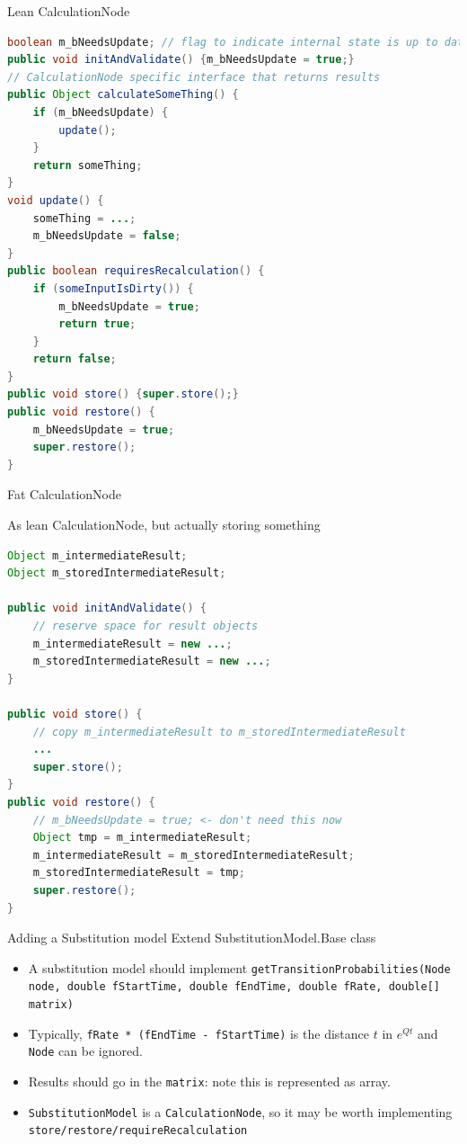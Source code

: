 \documentclass{beamer}
\theoremstyle{definition}
\begin{document}
\begin{frame}[containsverbatim]{Lean CalculationNode}


\begin{lstlisting}[language=java]
boolean m_bNeedsUpdate; // flag to indicate internal state is up to date
public void initAndValidate() {m_bNeedsUpdate = true;}
// CalculationNode specific interface that returns results
public Object calculateSomeThing() {
	if (m_bNeedsUpdate) {
		update();
	}
	return someThing;
}
void update() {
	someThing = ...;
	m_bNeedsUpdate = false;
}
public boolean requiresRecalculation() {
	if (someInputIsDirty()) {
		m_bNeedsUpdate = true;
		return true;
	}
	return false;
}
public void store() {super.store();}
public void restore() {
	m_bNeedsUpdate = true;
	super.restore();
}
\end{lstlisting}
\end{frame}

\begin{frame}[containsverbatim]{Fat CalculationNode}

As lean CalculationNode, but actually storing something

\begin{lstlisting}[language=java]
Object m_intermediateResult;
Object m_storedIntermediateResult;

public void initAndValidate() {
	// reserve space for result objects
	m_intermediateResult = new ...;
 	m_storedIntermediateResult = new ...;
}

public void store() {
	// copy m_intermediateResult to m_storedIntermediateResult
	...
	super.store();
}
public void restore() {
	// m_bNeedsUpdate = true; <- don't need this now
	Object tmp = m_intermediateResult;
	m_intermediateResult = m_storedIntermediateResult;
	m_storedIntermediateResult = tmp;
	super.restore();
}
\end{lstlisting}

\end{frame}



\begin{frame}[containsverbatim]{Adding a Substitution model}
Extend SubstitutionModel.Base class

\begin{itemize}
\item A substitution model should implement {\tt getTransitionProbabilities(Node node, double fStartTime, double fEndTime, double fRate, double[] matrix)}
\item Typically, {\tt fRate * (fEndTime - fStartTime)} is the distance $t$ in $e^{Qt}$
and {\tt Node} can be ignored.
\item Results should go in the {\tt matrix}: note this is represented as array.
\item {\tt SubstitutionModel} is a {\tt CalculationNode}, so it may be worth implementing {\tt store/restore/requireRecalculation}
\end{itemize}

\end{frame}
\end{document}
